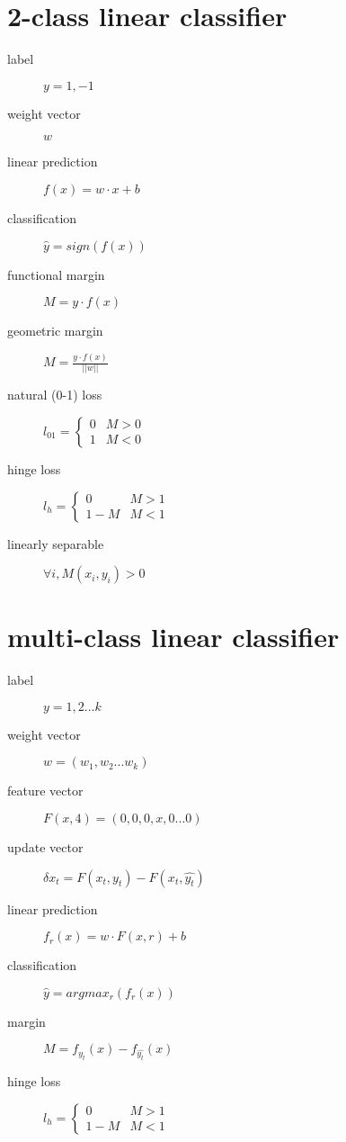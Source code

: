 \documentclass[12pt]{article}
\begin{document}
\begin{multicols}{2}

  \section{2-class linear classifier}
  \begin{description}
  \item[label] $y = 1, -1$
  \item[weight vector] $w$
  \item[linear prediction] $f(x) = w \cdot x + b$
  \item[classification] $\hat{y} = sign(f(x))$
  \item[functional margin] $M = y \cdot f(x)$
  \item[geometric margin] $M = \frac{y \cdot f(x)}{||w||}$
  \item[natural (0-1) loss]
    $l_{01} =
    \begin{cases}
      0 & M > 0 \\
      1 & M < 0
    \end{cases}$
  \item[hinge loss]
    $l_{h} =
    \begin{cases}
      0 & M > 1 \\
      1 - M & M < 1
    \end{cases}$
    \item[linearly separable] $\forall i, M(x_i, y_i) > 0$
  \end{description}

  \section{multi-class linear classifier}
  \begin{description}
  \item[label] $y = 1, 2...k$
  \item[weight vector] $w = (w_1, w_2...w_k)$
  \item[feature vector] $F(x,4) = (0,0,0,x,0...0)$
  \item[update vector] $\delta x_t = F(x_t,y_t) - F(x_t,\hat{y_t})$
  \item[linear prediction] $f_r(x) = w \cdot F(x,r) + b$
  \item[classification] $\hat{y} = argmax_r(f_r(x))$
  \item[margin] $M = f_{y_t}(x) - f_{\hat{y_t}}(x)$
  \item[hinge loss]
    $l_{h} =
    \begin{cases}
      0 & M > 1 \\
      1 - M & M < 1
    \end{cases}$
  \end{description}


\end{multicols}
\end{document}
